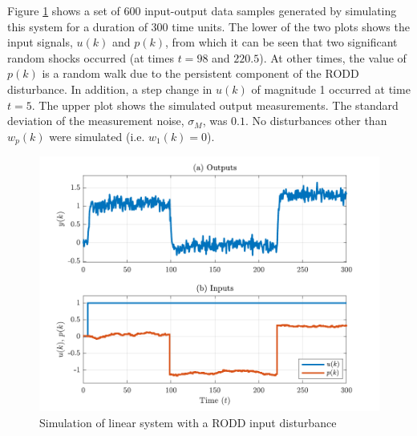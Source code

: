 Figure \ref{fig:rod-obs-sim1-ioplot} shows a set of 600 input-output data samples generated by simulating this system for a duration of 300 time units. The lower of the two plots shows the input signals, $u(k)$ and $p(k)$, from which it can be seen that two significant random shocks occurred (at times $t=98$ and $220.5$). At other times, the value of $p(k)$ is a random walk due to the persistent component of the RODD disturbance. In addition, a step change in $u(k)$ of magnitude 1 occurred at time $t=5$. The upper plot shows the simulated output measurements. The standard deviation of the measurement noise, $\sigma_M$, was $0.1$. No disturbances other than $w_p(k)$ were simulated (i.e. $w_1(k)=0$). 
\begin{figure}[htp]
	\centering
	\includegraphics[width=14cm]{images/rod_obs_sim1_ioplot.pdf}
	\caption{Simulation of linear system with a RODD input disturbance}
	\label{fig:rod-obs-sim1-ioplot}
\end{figure}

